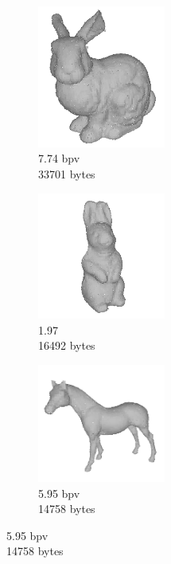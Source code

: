 \begin{figure}[t]
        \begin{subfigure}[b]{4.4cm}
                \includegraphics[width=4.2cm]{images/results/compression/bunnyd}
                \caption{7.74 bpv\\33701 bytes}
                \label{fig:FIG_BUNNYD}
        \end{subfigure}%
        \begin{subfigure}[b]{4.4cm}
                \includegraphics[width=4.2cm]{images/results/compression/rabbitd}
                \caption{1.97\\16492 bytes}
                \label{fig:FIG_RABBITD}
        \end{subfigure}%
        \begin{subfigure}[b]{4.4cm}
                \includegraphics[width=4.2cm]{images/results/compression/horsed}
                \caption{5.95 bpv\\14758 bytes}
                \label{fig:FIG_HORSED}
        \end{subfigure}
        

\end{figure}
